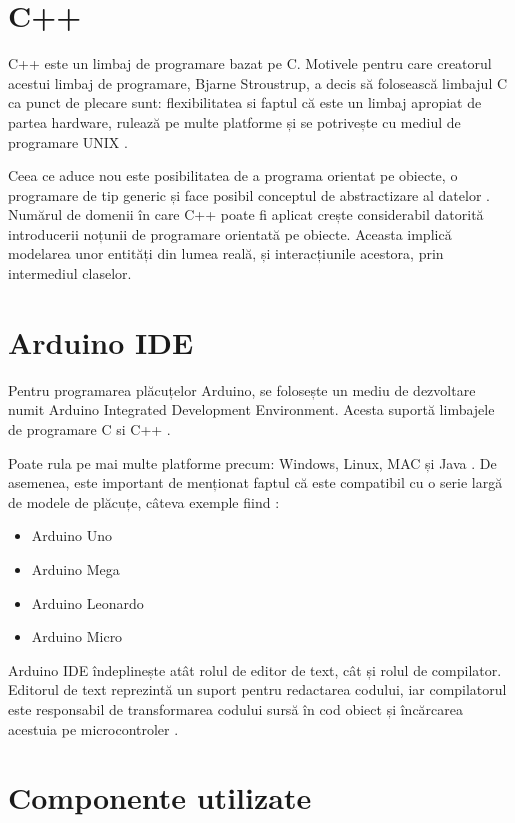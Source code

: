 \section{C++}

	C++ este un limbaj de programare bazat pe C. Motivele pentru care creatorul acestui limbaj de programare, Bjarne Stroustrup, a decis să folosească limbajul C ca punct de plecare sunt: flexibilitatea si faptul că este un limbaj apropiat de partea hardware, rulează pe multe platforme și se potrivește cu mediul de programare UNIX \cite{c++}.

	Ceea ce aduce nou este posibilitatea de a programa orientat pe obiecte, o programare de tip generic și face posibil conceptul de abstractizare al datelor \cite{c++}. Numărul de domenii în care C++ poate fi aplicat crește considerabil datorită introducerii noțunii de programare orientată pe obiecte. Aceasta implică modelarea unor entități din lumea reală, și interacțiunile acestora, prin intermediul claselor. 

\section{Arduino IDE}

	Pentru programarea plăcuțelor Arduino, se folosește un mediu de dezvoltare numit Arduino Integrated Development Environment. Acesta suportă limbajele de programare C si C++ \cite{arduinoIDE}. 

	Poate rula pe mai multe platforme precum: Windows, Linux, MAC și Java \cite{arduinoIDE}. De asemenea, este important de menționat faptul că este compatibil cu o serie largă de modele de plăcuțe, câteva exemple fiind \cite{arduinoIDE}:
		\begin{itemize}
			\setlength{\itemindent}{2em}
			\itemsep0em
			\item Arduino Uno
			\item Arduino Mega
			\item Arduino Leonardo
			\item Arduino Micro
		\end{itemize} 

	Arduino IDE îndeplinește atât rolul de editor de text, cât și rolul de compilator. Editorul de text reprezintă un suport pentru redactarea codului, iar compilatorul este responsabil de transformarea codului sursă în cod obiect și încărcarea acestuia pe microcontroler \cite{arduinoIDE}.

\section{Componente utilizate}

